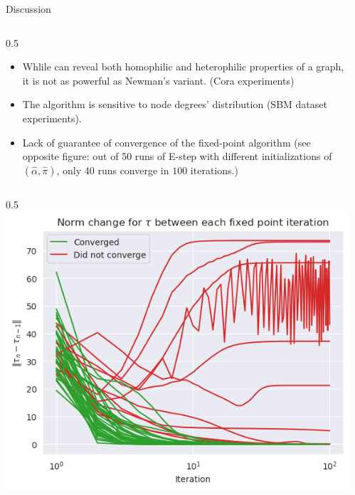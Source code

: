 \documentclass[final]{beamer}
\newlength{\sepwidth}
\newlength{\colwidth}
\newcommand{\separatorcolumn}{\begin{column}{\sepwidth}\end{column}}
\begin{document}
\begin{frame}[t]
\begin{columns}[t]
\begin{column}{\colwidth}
      \begin{exampleblock}{Discussion}
        \begin{column}{0.5\colwidth}
          \justifying
          \begin{itemize}
            \item Whlile \cite{main_article} can reveal both homophilic and heterophilic properties of a graph, it is not as powerful as Newman's variant. (Cora experiments)
            \item The algorithm is sensitive to node degrees' distribution (SBM dataset experiments).
            \item Lack of guarantee of convergence of the fixed-point algorithm (see opposite figure: out of 50 runs of E-step with different initializations of $(\hat{\alpha}, \hat{\pi})$, only 40 runs converge in $100$ iterations.)
          \end{itemize}
        \end{column}
        \begin{column}{0.5\colwidth}
          \centering\\
          \includegraphics[width=0.76\linewidth]{figures/fixed-point-convergence.png}
        \end{column}
      \end{exampleblock}

    \end{column}
    \separatorcolumn



  \end{columns}
\end{frame}
\end{document}
